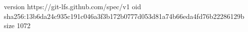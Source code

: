 version https://git-lfs.github.com/spec/v1
oid sha256:13b6da24c935c191c046a3f3b172b0777d053d81a74b66eda4fd76b22286129b
size 1072
